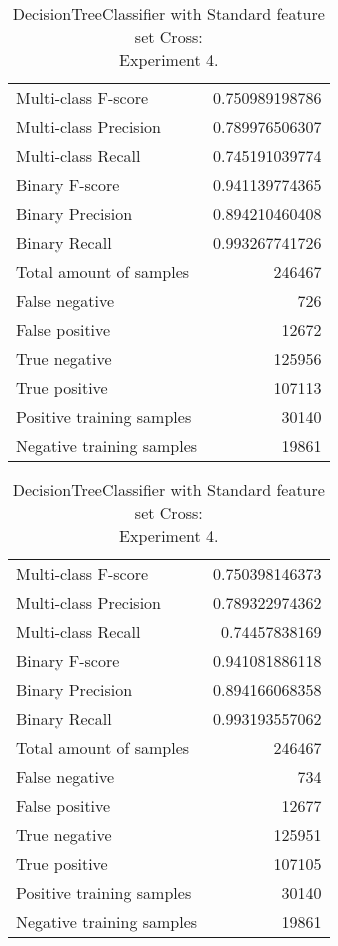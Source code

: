 \begin{table}[H]
\begin{minipage}{0.5\textwidth}
\caption{DecisionTreeClassifier with Standard feature set Cross: \\Experiment 3.}
\centering
\begin{tabular}{l r}
\toprule
Multi-class F-score & 0.750989198786 \\
Multi-class Precision & 0.789976506307 \\
Multi-class Recall & 0.745191039774 \\
\midrule
Binary F-score & 0.941139774365 \\
Binary Precision & 0.894210460408 \\
Binary Recall & 0.993267741726 \\
\midrule
Total amount of samples & 246467 \\
False negative & 726 \\
False positive & 12672 \\
True negative & 125956 \\
True positive & 107113 \\
\midrule
Positive training samples & 30140 \\
Negative training samples & 19861 \\
\bottomrule
\end{tabular}
\end{minipage}
\hfillx
\begin{minipage}{0.5\textwidth}
\caption{DecisionTreeClassifier with Standard feature set Cross: \\Experiment 4.}
\centering
\begin{tabular}{l r}
\toprule
Multi-class F-score & 0.750398146373 \\
Multi-class Precision & 0.789322974362 \\
Multi-class Recall & 0.74457838169 \\
\midrule
Binary F-score & 0.941081886118 \\
Binary Precision & 0.894166068358 \\
Binary Recall & 0.993193557062 \\
\midrule
Total amount of samples & 246467 \\
False negative & 734 \\
False positive & 12677 \\
True negative & 125951 \\
True positive & 107105 \\
\midrule
Positive training samples & 30140 \\
Negative training samples & 19861 \\
\bottomrule
\end{tabular}
\end{minipage}
\end{table}


